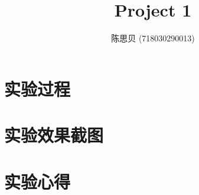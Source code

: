 \documentclass[UTF8]{ctexrep}
\title{
    \horrule{0.5pt} \\[0.4cm]
    \huge Project 1 \\
    \horrule{2pt}
}
\author{
    陈思贝 (718030290013)
}
\date{
}
\begin{document}
    \maketitle
    \section{实验过程}
    \section{实验效果截图}
    \section{实验心得}
\end{document}
